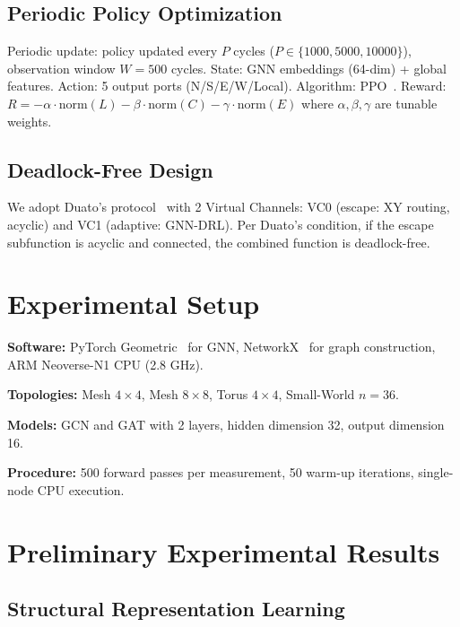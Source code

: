 \documentclass[conference]{IEEEtran}
\begin{document}
\subsection{Periodic Policy Optimization}

Periodic update: policy updated every $P$ cycles ($P\in\{1000,5000,10000\}$), observation window $W=500$ cycles. State: GNN embeddings (64-dim) + global features. Action: 5 output ports (N/S/E/W/Local). Algorithm: PPO~\cite{ppo2017}. Reward: $R = -\alpha\cdot\text{norm}(L) - \beta\cdot\text{norm}(C) - \gamma\cdot\text{norm}(E)$ where $\alpha,\beta,\gamma$ are tunable weights.

\subsection{Deadlock-Free Design}

We adopt Duato's protocol~\cite{duato1996} with 2 Virtual Channels: VC0 (escape: XY routing, acyclic) and VC1 (adaptive: GNN-DRL). Per Duato's condition, if the escape subfunction is acyclic and connected, the combined function is deadlock-free.

\section{Experimental Setup}
\label{sec:experiment}

\noindent\textbf{Software:} PyTorch Geometric~\cite{pyg2019} for GNN, NetworkX~\cite{networkx2008} for graph construction, ARM Neoverse-N1 CPU (2.8 GHz).

\noindent\textbf{Topologies:} Mesh $4\times4$, Mesh $8\times8$, Torus $4\times4$, Small-World $n=36$.

\noindent\textbf{Models:} GCN and GAT with 2 layers, hidden dimension 32, output dimension 16.

\noindent\textbf{Procedure:} 500 forward passes per measurement, 50 warm-up iterations, single-node CPU execution.

\section{Preliminary Experimental Results}
\label{sec:results}

\subsection{Structural Representation Learning}
\label{sec:results-correlation}
\end{document}
